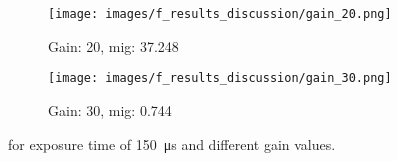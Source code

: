 \begin{figure}[h]
    \vspace{5mm}
    
    \begin{subfigure}[b]{0.4\textwidth}
        \centering
        \texttt{[image: images/f\_results\_discussion/gain\_20.png]}
        \caption{Gain: 20, \gls{mig}: 37.248}
        \label{subfig:underexposed.png}
    \end{subfigure}
    \hspace{1cm}
    \begin{subfigure}[b]{0.4\textwidth}
        \centering
        \texttt{[image: images/f\_results\_discussion/gain\_30.png]}
        \caption{Gain: 30, \gls{mig}: 0.744}
        \label{subfig:underexposed.png}
    \end{subfigure}
    \caption{ for exposure time of \SI{150}{\micro\second} and different gain values.}
    \label{fig:gain_mig_0_to_30}
\end{figure}

